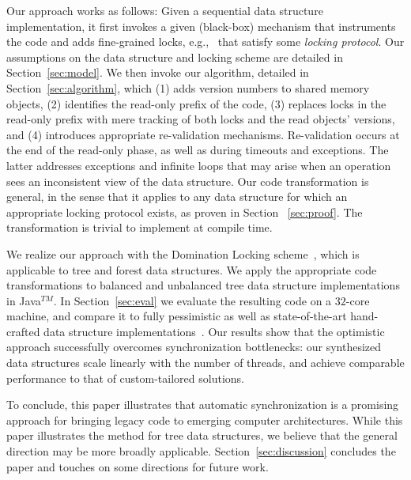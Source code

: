 Our approach works as follows: Given a sequential data structure implementation,
it first invokes a given (black-box) mechanism that instruments the code and adds
fine-grained locks, e.g.,~\cite{Gueta2011,MZGB:POPL06} that satisfy some
\emph{locking protocol}. Our assumptions on the data structure and locking scheme
are detailed in Section~\ref{sec:model}.
We then invoke our algorithm, detailed in Section~\ref{sec:algorithm}, which
(1) adds version numbers to shared memory objects,
(2) identifies the read-only prefix of the code,
(3) replaces locks in the read-only prefix with mere tracking of both locks and the read objects' versions, and
(4) introduces appropriate re-validation mechanisms.
Re-validation occurs at the end of the read-only phase, as well as during timeouts and exceptions.
The latter addresses exceptions and infinite loops that may arise when an operation sees an inconsistent view of the data structure.
Our code transformation is general, in the sense that it applies to any data structure for which an appropriate locking protocol exists,
as proven in Section ~\ref{sec:proof}. The transformation is trivial to implement at compile time.

We realize our approach with the Domination Locking scheme~\cite{Gueta2011},
which is applicable to tree and forest data structures.
We apply the appropriate code transformations to balanced and unbalanced tree data structure implementations in Java$^{TM}$.
In Section~\ref{sec:eval} we evaluate the resulting code on a $32$-core machine,
and compare it to fully pessimistic as well as state-of-the-art hand-crafted
data structure implementations~\cite{DrachslerVY2014,BronsonCCO2010}.
Our results show that the optimistic approach successfully overcomes synchronization bottlenecks:
our synthesized data structures scale linearly  with the number of threads,
and achieve comparable performance to that of custom-tailored solutions.

To conclude, this paper illustrates that automatic synchronization is a promising approach for bringing legacy code to emerging computer architectures.
While this paper illustrates the method for tree data structures, we believe that the general direction may be more broadly applicable.
Section~\ref{sec:discussion} concludes the paper and touches on some directions for future work.